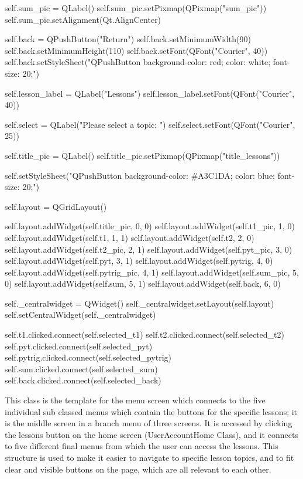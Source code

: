 \begin{python}
        self.sum_pic = QLabel()
        self.sum_pic.setPixmap(QPixmap("sum_pic"))
        self.sum_pic.setAlignment(Qt.AlignCenter)

        self.back = QPushButton("Return")
        self.back.setMinimumWidth(90)
        self.back.setMinimumHeight(110)
        self.back.setFont(QFont("Courier", 40))
        self.back.setStyleSheet("QPushButton {background-color: red; color: white; font-size: 20;}")
    
        self.lesson_label = QLabel("Lessons")
        self.lesson_label.setFont(QFont("Courier", 40))
        
        self.select = QLabel("Please select a topic: ")
        self.select.setFont(QFont("Courier", 25))
        
        self.title_pic = QLabel()
        self.title_pic.setPixmap(QPixmap("title_lessons"))

        self.setStyleSheet("QPushButton {background-color: #A3C1DA; color: blue; font-size: 20;}")

        self.layout = QGridLayout()

        self.layout.addWidget(self.title_pic, 0, 0) 
        self.layout.addWidget(self.t1_pic, 1, 0)
        self.layout.addWidget(self.t1, 1, 1)
        self.layout.addWidget(self.t2, 2, 0)
        self.layout.addWidget(self.t2_pic, 2, 1)
        self.layout.addWidget(self.pyt_pic, 3, 0)
        self.layout.addWidget(self.pyt, 3, 1)
        self.layout.addWidget(self.pytrig, 4, 0)
        self.layout.addWidget(self.pytrig_pic, 4, 1)
        self.layout.addWidget(self.sum_pic, 5, 0)
        self.layout.addWidget(self.sum, 5, 1)
        self.layout.addWidget(self.back, 6, 0)

        self._centralwidget = QWidget()
        self._centralwidget.setLayout(self.layout)
        self.setCentralWidget(self._centralwidget)

        self.t1.clicked.connect(self.selected_t1) 
        self.t2.clicked.connect(self.selected_t2)
        self.pyt.clicked.connect(self.selected_pyt)
        self.pytrig.clicked.connect(self.selected_pytrig)
        self.sum.clicked.connect(self.selected_sum)
        self.back.clicked.connect(self.selected_back)
\end{python}

This class is the template for the menu screen which connects to the five individual sub classed menus which contain the buttons for the specific lessons; it is the middle screen in a branch menu of three screens. It is accessed by clicking the lessons button on the home screen (UserAccountHome Class), and it connects to five different final menus from which the user can access the lessons. This structure is used to make it easier to navigate to specific lesson topics, and to fit clear and visible buttons on the page, which are all relevant to each other. 

